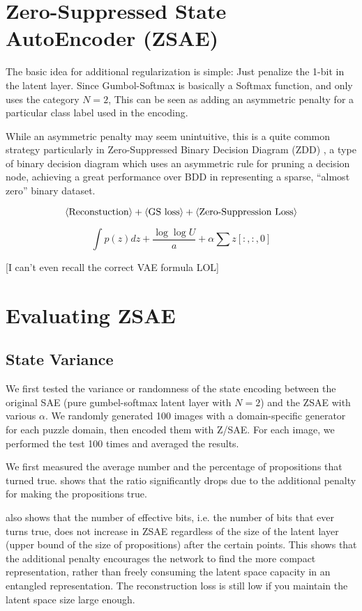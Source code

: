 \section{Zero-Suppressed State AutoEncoder (ZSAE)}

The basic idea for additional regularization is simple: Just penalize the
1-bit in the latent layer. Since Gumbol-Softmax is basically a Softmax function,
and \latentplanner only uses the category $N=2$, This can be seen as adding an
asymmetric penalty for a particular class label used in the encoding.

While an asymmetric penalty may seem unintuitive, this is a quite common
strategy particularly in Zero-Suppressed Binary Decision Diagram (ZDD)
\cite{Minato??}, a type of binary decision diagram \cite{Bryent88} which
uses an asymmetric rule for pruning a decision node, achieving a great
performance over BDD in representing a sparse, ``almost zero'' binary dataset.

\[
 {\left<\text{Reconstuction}\right>} + {\left<\text{GS loss}\right>} + {\left<\text{Zero-Suppression Loss}\right>}
\]

\[
 \int p(z)dz + \frac{\log {\log{U}}}{a} + \alpha \sum z[:,:,0]
\]

[I can't even recall the correct VAE formula LOL]

\section{Evaluating ZSAE}

\subsection{State Variance}

We first tested the variance or randomness of the state encoding between
the original SAE (pure gumbel-softmax latent layer with $N=2$) and the ZSAE with various $\alpha$.
We randomly generated 100 images with a domain-specific generator for each puzzle domain,
then encoded them with Z/SAE. For each image, we performed the test 100 times and averaged the results.

We first measured the average number and the percentage of propositions that turned true.
 shows that the ratio significantly drops due to the additional penalty
for making the propositions true.

 also shows that the number of effective bits,
i.e. the number of bits that ever turns true, does not increase in ZSAE
regardless of the size of the latent layer (upper bound of the size of
propositions) after the certain points.  This shows that the additional
penalty encourages the network to find the more compact representation,
rather than freely consuming the latent space capacity in an entangled representation.
The reconstruction loss is still low if you maintain the latent space
size large enough.

